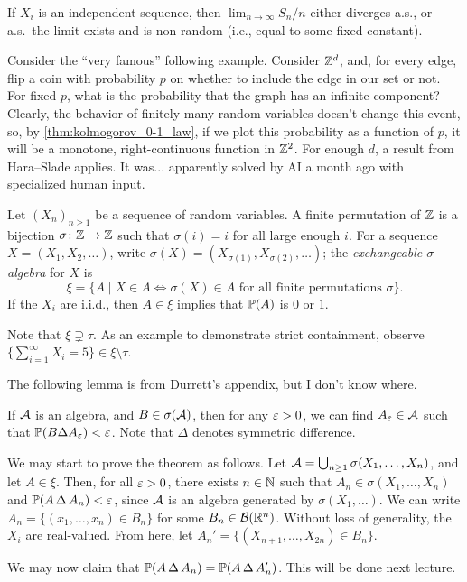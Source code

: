 \begin{corollary}
    If $X_i$ is an independent sequence, then $\lim_{n \to \infty} S_n/n$ either diverges a.s., or a.s.\ the limit exists and is non-random (i.e., equal to some fixed constant).
\end{corollary}

Consider the ``very famous'' following example. Consider $\mathbb Z^d$, and, for every edge, flip a coin with probability $p$ on whether to include the edge in our set or not. For fixed $p$, what is the probability that the graph has an infinite component? Clearly, the behavior of finitely many random variables doesn't change this event, so, by \ref{thm:kolmogorov_0-1_law}, if we plot this probability as a function of $p$, it will be a monotone, right-continuous function in $\mathbb Z^2$. For enough $d$, a result from Hara--Slade applies. It was... apparently solved by AI a month ago with specialized human input.

\begin{theorem} \label{thm:hewitt-savage_0-1_law}
    Let $(X_n)_{n \geq 1}$ be a sequence of random variables. A finite permutation of $\mathbb Z$ is a bijection $\sigma \colon \mathbb Z \to \mathbb Z$ such that $\sigma(i) = i$ for all large enough $i$. For a sequence $X = (X_1, X_2, \dots)$, write $\sigma(X) = (X_{\sigma(1)}, X_{\sigma(2)}, \dots)$; the \textit{exchangeable $\sigma$-algebra} for $X$ is
    \[ \xi = \{A \mid X \in A \iff \sigma(X) \in A \text{ for all finite permutations $\sigma$}\}. \]
    If the $X_i$ are i.i.d., then $A \in \xi$ implies that $\mathbb P(A)$ is $0$ or $1$.
\end{theorem}
Note that $\xi \supsetneq \tau$. As an example to demonstrate strict containment, observe $\{\sum_{i=1}^\infty X_i = 5\} \in \xi \setminus \tau$.

\newpage
The following lemma is from Durrett's appendix, but I don't know where.
\begin{lemma}
    If $\mathcal A$ is an algebra, and $B \in \sigma(\mathcal A)$, then for any $\varepsilon > 0$, we can find $A_\varepsilon \in \mathcal A$ such that $\mathbb P(B \Delta A_\varepsilon) < \varepsilon$. Note that $\Delta$ denotes symmetric difference.
\end{lemma}

We may start to prove the theorem as follows. Let $\mathcal A = \bigcup_{n \geq 1} \sigma(X_1, \dots, X_n)$, and let $A \in \xi$. Then, for all $\varepsilon > 0$, there exists $n \in \mathbb N$ such that $A_n \in \sigma(X_1, \dots, X_n)$ and $\mathbb P(A \,\Delta\, A_n) < \varepsilon$, since $\mathcal A$ is an algebra generated by $\sigma(X_1, \dots)$. We can write $A_n = \{(x_1, \dots, x_n) \in B_n\}$ for some $B_n \in \mathcal B(\mathbb R^n)$. Without loss of generality, the $X_i$ are real-valued. From here, let $A_n' = \{(X_{n+1}, \dots, X_{2n}) \in B_n\}$.

We may now claim that $\mathbb P(A \,\Delta\, A_n) = \mathbb P(A \,\Delta\, A_n')$. This will be done next lecture.